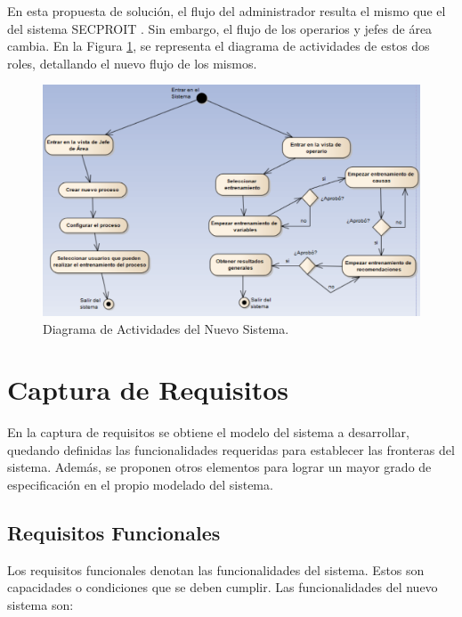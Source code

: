 En esta propuesta de solución, el flujo del administrador resulta el mismo que el del sistema SECPROIT \cite{elena}. Sin embargo, el flujo de los operarios y jefes de área cambia. En la Figura \ref{fig:actividades}, se representa el diagrama de actividades de estos dos roles, detallando el nuevo flujo de los mismos.

\begin{figure}[h]
\centering
 \includegraphics[width=0.5\linewidth]{imagen/actividades.png}
 \caption{Diagrama de Actividades del Nuevo Sistema.}
 \label{fig:actividades} 
\end{figure} 


\section{Captura de Requisitos}
En la captura de requisitos se obtiene el modelo del sistema a desarrollar, quedando definidas las funcionalidades requeridas para establecer las fronteras del sistema. Además, se proponen otros elementos para lograr un mayor grado de especificación en el propio modelado del sistema.

\subsection{Requisitos Funcionales}
Los requisitos funcionales denotan las funcionalidades del sistema. Estos son 
capacidades o condiciones que se deben cumplir. Las funcionalidades del nuevo sistema son:

